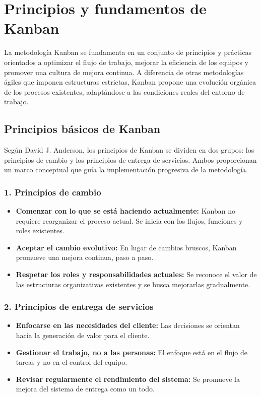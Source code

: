 \section{Principios y fundamentos de Kanban}

La metodología Kanban se fundamenta en un conjunto de principios y prácticas orientados a optimizar el flujo de trabajo, mejorar la eficiencia de los equipos y promover una cultura de mejora continua. A diferencia de otras metodologías ágiles que imponen estructuras estrictas, Kanban propone una evolución orgánica de los procesos existentes, adaptándose a las condiciones reales del entorno de trabajo.

\subsection{Principios básicos de Kanban}

Según David J. Anderson, los principios de Kanban se dividen en dos grupos: los principios de cambio y los principios de entrega de servicios. Ambos proporcionan un marco conceptual que guía la implementación progresiva de la metodología.

\subsubsection*{1. Principios de cambio}
\begin{itemize}
    \item \textbf{Comenzar con lo que se está haciendo actualmente:} Kanban no requiere reorganizar el proceso actual. Se inicia con los flujos, funciones y roles existentes.
    \item \textbf{Aceptar el cambio evolutivo:} En lugar de cambios bruscos, Kanban promueve una mejora continua, paso a paso.
    \item \textbf{Respetar los roles y responsabilidades actuales:} Se reconoce el valor de las estructuras organizativas existentes y se busca mejorarlas gradualmente.
\end{itemize}

\subsubsection*{2. Principios de entrega de servicios}
\begin{itemize}
    \item \textbf{Enfocarse en las necesidades del cliente:} Las decisiones se orientan hacia la generación de valor para el cliente.
    \item \textbf{Gestionar el trabajo, no a las personas:} El enfoque está en el flujo de tareas y no en el control del equipo.
    \item \textbf{Revisar regularmente el rendimiento del sistema:} Se promueve la mejora del sistema de entrega como un todo.
\end{itemize}

